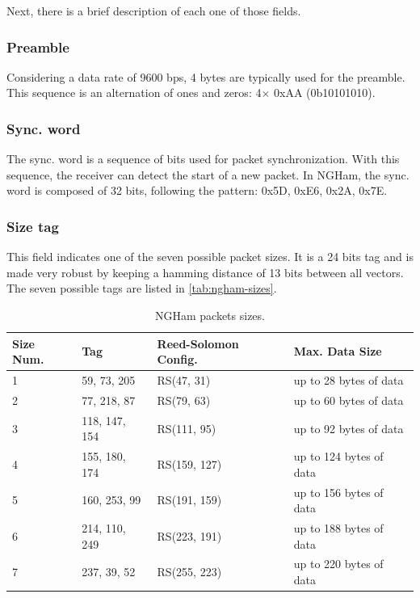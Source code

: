 Next, there is a brief description of each one of those fields.

\subsubsection{Preamble}

Considering a data rate of 9600 bps, 4 bytes are typically used for the preamble. This sequence is an alternation of ones and zeros: 4$\times$ 0xAA (0b10101010).

\subsubsection{Sync. word}

The sync. word is a sequence of bits used for packet synchronization. With this sequence, the receiver can detect the start of a new packet. In NGHam, the sync. word is composed of 32 bits, following the pattern: 0x5D, 0xE6, 0x2A, 0x7E.

\subsubsection{Size tag}

This field indicates one of the seven possible packet sizes. It is a 24 bits tag and is made very robust by keeping a hamming distance of 13 bits between all vectors. The seven possible tags are listed in \autoref{tab:ngham-sizes}.

\begin{table}[!ht]
    \centering
    \begin{tabular}{llll}
        \toprule[1.5pt]
        \textbf{Size Num.} & \textbf{Tag} & \textbf{Reed-Solomon Config.} & \textbf{Max. Data Size} \\
        \midrule
        1 & 59, 73, 205   & RS(47, 31)   & up to 28 bytes of data \\
        2 & 77, 218, 87   & RS(79, 63)   & up to 60 bytes of data \\
        3 & 118, 147, 154 & RS(111, 95)  & up to 92 bytes of data \\
        4 & 155, 180, 174 & RS(159, 127) & up to 124 bytes of data \\
        5 & 160, 253, 99  & RS(191, 159) & up to 156 bytes of data \\
        6 & 214, 110, 249 & RS(223, 191) & up to 188 bytes of data \\
        7 & 237, 39, 52   & RS(255, 223) & up to 220 bytes of data \\
        \bottomrule[1.5pt]
    \end{tabular}
    \caption{NGHam packets sizes.}
    \label{tab:ngham-sizes}
\end{table}

